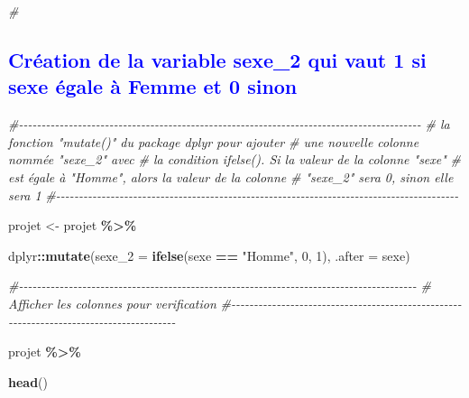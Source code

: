 \documentclass[
]{article}
\newenvironment{Shaded}{\begin{snugshade}}{\end{snugshade}}
\newcommand{\AttributeTok}[1]{\textcolor[rgb]{0.13,0.29,0.53}{#1}}
\newcommand{\CommentTok}[1]{\textcolor[rgb]{0.56,0.35,0.01}{\textit{#1}}}
\newcommand{\DecValTok}[1]{\textcolor[rgb]{0.00,0.00,0.81}{#1}}
\newcommand{\FunctionTok}[1]{\textcolor[rgb]{0.13,0.29,0.53}{\textbf{#1}}}
\newcommand{\NormalTok}[1]{#1}
\newcommand{\OtherTok}[1]{\textcolor[rgb]{0.56,0.35,0.01}{#1}}
\newcommand{\SpecialCharTok}[1]{\textcolor[rgb]{0.81,0.36,0.00}{\textbf{#1}}}
\newcommand{\StringTok}[1]{\textcolor[rgb]{0.31,0.60,0.02}{#1}}
\begin{document}
\begin{Shaded}
\begin{Highlighting}[]
\CommentTok{\#}
\end{Highlighting}
\end{Shaded}

\newpage

\textcolor{blue}{\subsection{Création de la variable sexe\_2 qui vaut 1 si sexe égale à Femme et 0 sinon}}

\begin{Shaded}
\begin{Highlighting}[]
\CommentTok{\#{-}{-}{-}{-}{-}{-}{-}{-}{-}{-}{-}{-}{-}{-}{-}{-}{-}{-}{-}{-}{-}{-}{-}{-}{-}{-}{-}{-}{-}{-}{-}{-}{-}{-}{-}{-}{-}{-}{-}{-}{-}{-}{-}{-}{-}{-}{-}{-}{-}{-}{-}{-}{-}{-}{-}{-}{-}{-}{-}{-}{-}{-}{-}{-}{-}{-}{-}{-}{-}{-}{-}{-}{-}{-}{-}{-}{-}{-}{-}{-}{-}{-}{-}{-}{-}{-}{-}{-}{-}}
\CommentTok{\#     la fonction "mutate()" du package dplyr pour ajouter }
\CommentTok{\#         une nouvelle colonne nommée "sexe\_2" avec }
\CommentTok{\#   la condition ifelse(). Si la valeur de la colonne "sexe"  }
\CommentTok{\#     est égale à "Homme", alors la valeur de la colonne }
\CommentTok{\#           "sexe\_2" sera 0, sinon elle sera 1}
\CommentTok{\#{-}{-}{-}{-}{-}{-}{-}{-}{-}{-}{-}{-}{-}{-}{-}{-}{-}{-}{-}{-}{-}{-}{-}{-}{-}{-}{-}{-}{-}{-}{-}{-}{-}{-}{-}{-}{-}{-}{-}{-}{-}{-}{-}{-}{-}{-}{-}{-}{-}{-}{-}{-}{-}{-}{-}{-}{-}{-}{-}{-}{-}{-}{-}{-}{-}{-}{-}{-}{-}{-}{-}{-}{-}{-}{-}{-}{-}{-}{-}{-}{-}{-}{-}{-}{-}{-}{-}{-}{-}}

\NormalTok{projet }\OtherTok{\textless{}{-}}\NormalTok{ projet }\SpecialCharTok{\%\textgreater{}\%}
  
\NormalTok{  dplyr}\SpecialCharTok{::}\FunctionTok{mutate}\NormalTok{(}\AttributeTok{sexe\_2 =} \FunctionTok{ifelse}\NormalTok{(sexe }\SpecialCharTok{==} \StringTok{"Homme"}\NormalTok{, }\DecValTok{0}\NormalTok{, }\DecValTok{1}\NormalTok{), }\AttributeTok{.after =}
\NormalTok{sexe)}


\CommentTok{\#{-}{-}{-}{-}{-}{-}{-}{-}{-}{-}{-}{-}{-}{-}{-}{-}{-}{-}{-}{-}{-}{-}{-}{-}{-}{-}{-}{-}{-}{-}{-}{-}{-}{-}{-}{-}{-}{-}{-}{-}{-}{-}{-}{-}{-}{-}{-}{-}{-}{-}{-}{-}{-}{-}{-}{-}{-}{-}{-}{-}{-}{-}{-}{-}{-}{-}{-}{-}{-}{-}{-}{-}{-}{-}{-}{-}{-}{-}{-}{-}{-}{-}{-}{-}{-}{-}{-}{-}}
\CommentTok{\#     Afficher les colonnes pour verification}
\CommentTok{\#{-}{-}{-}{-}{-}{-}{-}{-}{-}{-}{-}{-}{-}{-}{-}{-}{-}{-}{-}{-}{-}{-}{-}{-}{-}{-}{-}{-}{-}{-}{-}{-}{-}{-}{-}{-}{-}{-}{-}{-}{-}{-}{-}{-}{-}{-}{-}{-}{-}{-}{-}{-}{-}{-}{-}{-}{-}{-}{-}{-}{-}{-}{-}{-}{-}{-}{-}{-}{-}{-}{-}{-}{-}{-}{-}{-}{-}{-}{-}{-}{-}{-}{-}{-}{-}{-}{-}{-}}

\NormalTok{projet }\SpecialCharTok{\%\textgreater{}\%}
  
  \FunctionTok{head}\NormalTok{()}
\end{Highlighting}
\end{Shaded}
\end{document}
